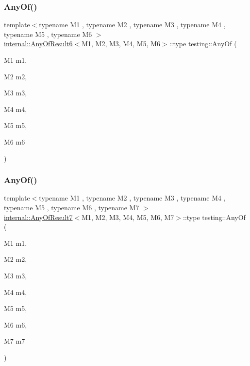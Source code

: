 \mbox{\label{namespacetesting_a747189264a49a426004366371f1a2575}} 
\subsubsection{\texorpdfstring{Any\+Of()}{AnyOf()}\hspace{0.1cm}{\footnotesize\ttfamily [5/9]}}
{\footnotesize\ttfamily template$<$typename M1 , typename M2 , typename M3 , typename M4 , typename M5 , typename M6 $>$ \\
\hyperlink{structtesting_1_1internal_1_1_any_of_result6}{internal\+::\+Any\+Of\+Result6}$<$M1, M2, M3, M4, M5, M6$>$\+::type testing\+::\+Any\+Of (\begin{DoxyParamCaption}\item[{M1}]{m1,  }\item[{M2}]{m2,  }\item[{M3}]{m3,  }\item[{M4}]{m4,  }\item[{M5}]{m5,  }\item[{M6}]{m6 }\end{DoxyParamCaption})\hspace{0.3cm}{\ttfamily [inline]}}

\mbox{\label{namespacetesting_a754d1bddb237e79613f6834af3329efa}} 
\subsubsection{\texorpdfstring{Any\+Of()}{AnyOf()}\hspace{0.1cm}{\footnotesize\ttfamily [6/9]}}
{\footnotesize\ttfamily template$<$typename M1 , typename M2 , typename M3 , typename M4 , typename M5 , typename M6 , typename M7 $>$ \\
\hyperlink{structtesting_1_1internal_1_1_any_of_result7}{internal\+::\+Any\+Of\+Result7}$<$M1, M2, M3, M4, M5, M6, M7$>$\+::type testing\+::\+Any\+Of (\begin{DoxyParamCaption}\item[{M1}]{m1,  }\item[{M2}]{m2,  }\item[{M3}]{m3,  }\item[{M4}]{m4,  }\item[{M5}]{m5,  }\item[{M6}]{m6,  }\item[{M7}]{m7 }\end{DoxyParamCaption})\hspace{0.3cm}{\ttfamily [inline]}}

